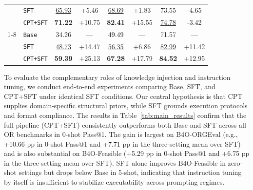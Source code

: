 \begin{table}[t!]
{\begin{tabular}{llcccccc}
                              & \hspace{1em} \texttt{SFT}    & \underline{65.93}& +5.46 & \underline{68.69}& +1.83 & 73.55           & -4.65 \\
                              & \hspace{1em} \texttt{CPT+SFT}& \textbf{71.22}  & \textcolor{slai}{+10.75} & \textbf{82.41}  & \textcolor{slai}{+15.55}& \underline{74.78}& -3.42 \\
\cmidrule(lr){1-8}
\multirow{3}{*}{B4O-ORGEval} & \hspace{1em} \texttt{Base}    & 34.26           & ---   & 49.49           & ---   & 71.57           & ---   \\
                             & \hspace{1em} \texttt{SFT}     & \underline{48.73}& +14.47& \underline{56.35}& +6.86 & \underline{82.99}& +11.42\\
                             & \hspace{1em} \texttt{CPT+SFT} & \textbf{59.39}  & \textcolor{slai}{+25.13} & \textbf{67.28}  & \textcolor{slai}{+17.79} & \textbf{84.52}  & \textcolor{slai}{+12.95} \\
\bottomrule
\end{tabular}}
\end{table}

To evaluate the complementary roles of knowledge injection and instruction tuning, we conduct end-to-end experiments comparing Base, SFT, and CPT+SFT under identical SFT conditions. Our central hypothesis is that CPT supplies domain-specific structural priors, while SFT grounds execution protocols and format compliance. The results in Table~\ref{tab:main_results} confirm that the full pipeline (CPT+SFT) consistently outperforms both Base and SFT across all OR benchmarks in 0-shot Pass@1. The gain is largest on B4O-ORGEval (e.g., +10.66 pp in 0-shot Pass@1 and +7.71 pp in the three-setting mean over SFT) and is also substantial on B4O-Feasible (+5.29 pp in 0-shot Pass@1 and +6.75 pp in the three-setting mean over SFT). SFT alone improves B4O-Feasible in zero-shot settings but drops below Base in 5-shot, indicating that instruction tuning by itself is insufficient to stabilize executability across prompting regimes.

